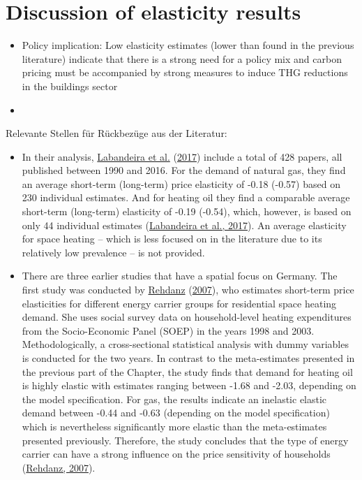 \documentclass[12pt,twoside]{reedthesis}
\begin{document}
\hypertarget{discussion-of-elasticity-results}{%
\section{Discussion of elasticity results}\label{discussion-of-elasticity-results}}
\begin{itemize}
\item
  Policy implication: Low elasticity estimates (lower than found in the previous literature) indicate that there is a strong need for a policy mix and carbon pricing must be accompanied by strong measures to induce THG reductions in the buildings sector
\item
\end{itemize}
Relevante Stellen für Rückbezüge aus der Literatur:
\begin{itemize}
\item
  In their analysis, \protect\hyperlink{ref-labandeira_etal17}{Labandeira et al.} (\protect\hyperlink{ref-labandeira_etal17}{2017}) include a total of 428 papers, all published between 1990 and 2016. For the demand of natural gas, they find an average short-term (long-term) price elasticity of -0.18 (-0.57) based on 230 individual estimates. And for heating oil they find a comparable average short-term (long-term) elasticity of -0.19 (-0.54), which, however, is based on only 44 individual estimates (\protect\hyperlink{ref-labandeira_etal17}{Labandeira et al., 2017}). An average elasticity for space heating -- which is less focused on in the literature due to its relatively low prevalence -- is not provided.
\item
  There are three earlier studies that have a spatial focus on Germany. The first study was conducted by \protect\hyperlink{ref-rehdanz07}{Rehdanz} (\protect\hyperlink{ref-rehdanz07}{2007}), who estimates short-term price elasticities for different energy carrier groups for residential space heating demand. She uses social survey data on household-level heating expenditures from the Socio-Economic Panel (SOEP) in the years 1998 and 2003. Methodologically, a cross-sectional statistical analysis with dummy variables is conducted for the two years. In contrast to the meta-estimates presented in the previous part of the Chapter, the study finds that demand for heating oil is highly elastic with estimates ranging between -1.68 and -2.03, depending on the model specification. For gas, the results indicate an inelastic elastic demand between -0.44 and -0.63 (depending on the model specification) which is nevertheless significantly more elastic than the meta-estimates presented previously. Therefore, the study concludes that the type of energy carrier can have a strong influence on the price sensitivity of households (\protect\hyperlink{ref-rehdanz07}{Rehdanz, 2007}).

\end{itemize}
\end{document}
